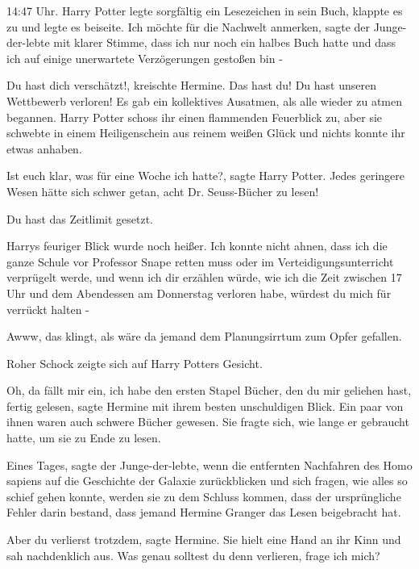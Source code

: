 14:47 Uhr. Harry Potter legte sorgfältig ein Lesezeichen in sein Buch, klappte
es zu und legte es beiseite. \glqq{}Ich möchte für die Nachwelt anmerken\grqq{},
sagte der Junge-der-lebte mit klarer Stimme, \glqq{}dass ich nur noch ein halbes
Buch hatte und dass ich auf einige unerwartete Verzögerungen gestoßen bin
-\grqq{}

\glqq{}Du hast dich verschätzt!\grqq{}, kreischte Hermine. \glqq{}Das hast du! Du
hast unseren Wettbewerb verloren!\grqq{} Es gab ein kollektives Ausatmen, als
alle wieder zu atmen begannen. Harry Potter schoss ihr einen flammenden
Feuerblick zu, aber sie schwebte in einem Heiligenschein aus reinem weißen Glück
und nichts konnte ihr etwas anhaben.

\glqq{}Ist euch klar, was für eine Woche ich hatte?\grqq{}, sagte Harry Potter.
\glqq{}Jedes geringere Wesen hätte sich schwer getan, acht Dr. Seuss-Bücher zu
lesen!\grqq{}

\glqq{}Du hast das Zeitlimit gesetzt.\grqq{}

Harrys feuriger Blick wurde noch heißer. \glqq{}Ich konnte nicht ahnen, dass ich
die ganze Schule vor Professor Snape retten muss oder im Verteidigungsunterricht
verprügelt werde, und wenn ich dir erzählen würde, wie ich die Zeit zwischen 17
Uhr und dem Abendessen am Donnerstag verloren habe, würdest du mich für verrückt
halten -\grqq{}

\glqq{}Awww, das klingt, als wäre da jemand dem Planungsirrtum zum Opfer
gefallen.\grqq{}

Roher Schock zeigte sich auf Harry Potters Gesicht.

\glqq{}Oh, da fällt mir ein, ich habe den ersten Stapel Bücher, den du mir
geliehen hast, fertig gelesen\grqq{}, sagte Hermine mit ihrem besten
unschuldigen Blick. Ein paar von ihnen waren auch schwere Bücher gewesen. Sie
fragte sich, wie lange er gebraucht hatte, um sie zu Ende zu lesen.

\glqq{}Eines Tages\grqq{}, sagte der Junge-der-lebte, \glqq{}wenn die entfernten
Nachfahren des Homo sapiens auf die Geschichte der Galaxie zurückblicken und
sich fragen, wie alles so schief gehen konnte, werden sie zu dem Schluss kommen,
dass der ursprüngliche Fehler darin bestand, dass jemand Hermine Granger das
Lesen beigebracht hat.\grqq{}

\glqq{}Aber du verlierst trotzdem\grqq{}, sagte Hermine. Sie hielt eine Hand an
ihr Kinn und sah nachdenklich aus. \glqq{}Was genau solltest du denn verlieren,
frage ich mich?\grqq{}

